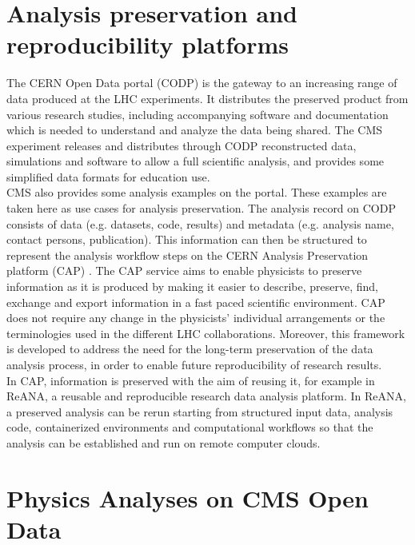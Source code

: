 \documentclass[letter]{article}
\newcommand\tab[1][1cm]{\hspace*{#1}}
\begin{document}
\section{Analysis preservation and reproducibility platforms}
\tab The CERN Open Data portal (CODP) \cite{codp} is the gateway to an increasing range of data produced at the LHC experiments.
It distributes the preserved product from various research studies, including accompanying software and documentation which is needed to understand and analyze the data being shared.
The CMS experiment releases and distributes through CODP reconstructed data, simulations and software to allow a full scientific
analysis, and provides some simplified data formats for education use. \vspace{5pt}
\\ \tab CMS also provides some analysis examples on the portal. These examples are taken here as use cases for analysis preservation. The analysis record on CODP consists of data (e.g. datasets, code, results) and metadata (e.g. analysis name, contact persons,
publication). This information can then be structured to represent the analysis workflow steps on the CERN Analysis Preservation platform (CAP) \cite{cap}. The CAP service aims to enable physicists to preserve information as it is produced by making it easier to describe, preserve, find, exchange and export information in a fast paced scientific environment. CAP does not require any change in the physicists’ individual arrangements or the terminologies used in the different LHC collaborations. Moreover, this framework is developed to address the need for the long-term preservation of the data analysis process, in order to enable future reproducibility of research
results. \newline
\\ \tab In CAP, information is preserved with the aim of reusing it, for example in ReANA\cite{reana}, a reusable and reproducible research data analysis platform. In ReANA, a preserved analysis can be rerun starting from structured input data, analysis code, containerized environments and computational workflows so that the analysis can be established and run on remote computer clouds.

\section{Physics Analyses on CMS Open Data}
\label{sec:theory}
\end{document}
